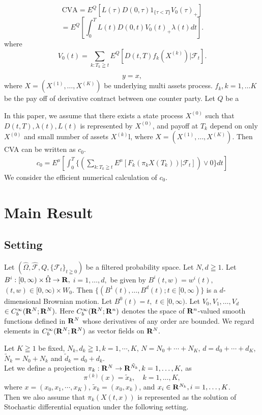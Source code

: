 \documentclass[12pt]{article}
\begin{document}
 
$$\text{CVA}= E^Q[L(\tau)D(0,\tau)1_{\{\tau <T\}}V_0(\tau)_{+}]$$
$$=E^{Q}[\int_0^T L(t)D(0,t) V_0(t)_{+} \lambda(t) dt ]  .$$
where $$V_0(t) = \sum_{k:T_k\geqq t} E^{Q}[D(t,T) f_k(X^{(k)}) |\mathcal{F}_t].$$
 
 $$
 y= x,
 $$
 where $X=(X^{(1)}, \ldots, X^{(K)})$ be underlying multi assets process. $f_k, k=1,\ldots K$ be the pay off of derivative contract between one counter party. Let $Q$ be a 
 
 
In this paper, we assume that there exists a state process $X^{(0)}$ such that $D(t,T), \lambda(t),
L(t)$ is represented by $X^{(0)}$, and payoff at $T_k$ depend on only $X^{(0)}$ and small number of 
assets $X^{(k)}$l, where $X=(X^{(1)}, \ldots, X^{(K)})$.
Then CVA can be written as $c_0$.
\begin{align}
c_0 = E^{\mu}[\int_{0}^T \{( \sum_{k:T_k\geqq t} E^{\mu}[F_k(\pi_k{X}(T_k)) |\mathcal{F}_t])\vee0\}dt ]
\end{align}
We consider the efficient numerical calculation of $c_0$.

\section{Main Result}
\subsection{Setting}
Let $(\hat{\Omega}, \hat{\mathcal{F}}, Q, \{\mathcal{F}_t\}_{t\geqq 0})$ be a filtered probability space.
Let $N, d \geqq 1.$
Let $B^i:[0,\infty )\times \hat{\Omega} \to {\bf R},$ $i=1,\ldots ,d,$ be given 
by
 $B^i(t,w) =w^i(t),$ $(t,w)\in [0,\infty )\times W_0.$
Then $ \{ (B^1(t), \ldots ,B^d(t) ; t \in [0,\infty ) \}$ 
is a $d$-dimensional Brownian motion.
Let $B^0(t) = t,$ $t \in [0,\infty ).$
Let $V_0,V_1,\ldots ,V_d$ 
$ \in C^{\infty}_b({\bf R}^N;{\bf R}^N).$
Here $C^{\infty}_b({\bf R}^N;{\bf R}^n)$ denotes 
the space of ${\bf R}^n$-valued smooth functions defined 
in ${\bf R}^N$ whose derivatives of any order are bounded.
We regard elements in $C^{\infty}_b({\bf R}^N;{\bf R}^N)$ 
as vector fields on ${\bf R}^N.$

Let $K \geqq 1$ be fixed, ${N}_k, d_k \geqq 1, k=1, \cdots, K$, 
$N= N_0+ \cdots + N_K$, $d=d_0+\cdots +d_K$, 
$ \tilde{N}_k=N_0+N_k$ and $\tilde{d}_k=d_0+d_k$.\\
Let we define a projection $\pi_k: {\bf R}^N \to {\bf R}^{\tilde{N}_k}, k=1,\ldots,K,$ as 
$$ \pi^{(k)}(x)= \tilde{x}_k, \quad k=1,\ldots,K,$$
where $x=(x_0,x_1, \cdots, x_K)$, $\tilde{x}_k=(x_0,x_k)$, and $x_i \in {\bf R}^{N_k}, i=1,\ldots,K$.\\
Then we also assume that $\pi_k(X(t,x))$  is represented as the solution of Stochastic differential equation
under the following setting.
\end{document}
